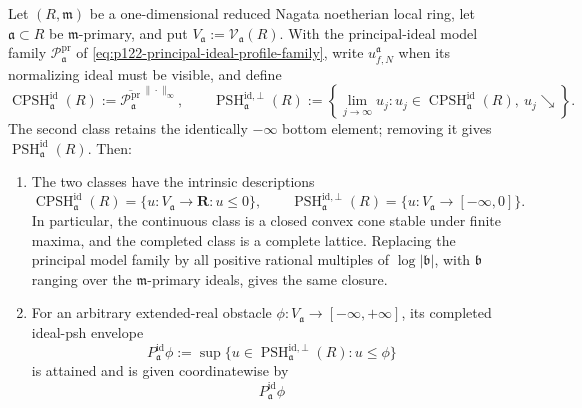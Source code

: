 \begin{theorem}
\label{thm:p122-curve-ideal-psh-functoriality}
Let \((R,\mathfrak m)\) be a one-dimensional reduced Nagata noetherian
local ring, let \(\mathfrak a\subset R\) be \(\mathfrak m\)-primary, and
put \(V_{\mathfrak a}:=\mathcal V_{\mathfrak a}(R)\).  With the
principal-ideal model family
\(\mathscr P_{\mathfrak a}^{\mathrm{pr}}\) of
\eqref{eq:p122-principal-ideal-profile-family}, write
\(u^{\mathfrak a}_{f,N}\) when its normalizing ideal must be visible, and
define
\[
 \operatorname{CPSH}^{\mathrm{id}}_{\mathfrak a}(R)
 :=\overline{\mathscr P_{\mathfrak a}^{\mathrm{pr}}}
                         ^{\,\|\cdot\|_\infty},
 \qquad
 \operatorname{PSH}^{\mathrm{id},\bot}_{\mathfrak a}(R)
 :=\left\{\lim_{j\to\infty}u_j:
       u_j\in\operatorname{CPSH}^{\mathrm{id}}_{\mathfrak a}(R),\
       u_j\searrow\right\}.
 \tag{\(\triangle\)}\label{eq:p122-curve-ideal-psh-definition}
\]
The second class retains the identically \(-\infty\) bottom element;
removing it gives
\(\operatorname{PSH}^{\mathrm{id}}_{\mathfrak a}(R)\).  Then:
\begin{enumerate}
\item The two classes have the intrinsic descriptions
      \[
       \operatorname{CPSH}^{\mathrm{id}}_{\mathfrak a}(R)
          =\{u:V_{\mathfrak a}\to\mathbf R:u\leq0\},
       \qquad
       \operatorname{PSH}^{\mathrm{id},\bot}_{\mathfrak a}(R)
          =\{u:V_{\mathfrak a}\to[-\infty,0]\}.
       \tag{\(\square\)}\label{eq:p122-curve-ideal-psh-orthants}
      \]
      In particular, the continuous class is a closed convex cone stable
      under finite maxima, and the completed class is a complete lattice.
      Replacing the principal model family by all positive rational
      multiples of \(\log|\mathfrak b|\), with \(\mathfrak b\) ranging
      over the \(\mathfrak m\)-primary ideals, gives the same closure.
\item For an arbitrary extended-real obstacle
      \(\phi:V_{\mathfrak a}\to[-\infty,+\infty]\), its completed
      ideal-psh envelope
      \[
       P^{\mathrm{id}}_{\mathfrak a}\phi
       :=\sup\{u\in
          \operatorname{PSH}^{\mathrm{id},\bot}_{\mathfrak a}(R):
          u\leq\phi\}
      \]
      is attained and is given coordinatewise by
      \[
                       P^{\mathrm{id}}_{\mathfrak a}\phi
\]
\end{enumerate}
\end{theorem}
